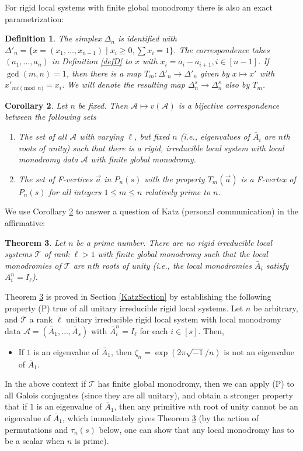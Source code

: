\documentclass[11pt]{amsart}
\newcommand\op{\operatorname}
\newcommand\mt{\mathcal{T}}
\newcommand\ma{\mathcal{A}}
\newtheorem{theorem}{Theorem}[section]
\newtheorem{corollary}[theorem]{Corollary}
\newtheorem{defi}[theorem]{Definition}
\numberwithin{theorem}{subsection}
\begin{document}

For rigid local systems with finite global monodromy there is also an exact parametrization:
\begin{defi}\label{aliA}
The simplex  $\Delta_n$ is identified with $\Delta'_n= \{{x}=(x_1,\dots, x_{n-1})\mid x_i\geq 0, \sum x_i=1\}$. The correspondence takes $(a_1,\dots, a_n)$ in Definition \ref{defD} to ${x}$ with $x_i=a_i-a_{i+1}, i\in[n-1]$.  If $\op{gcd}(m,n)=1$, then there is a map $T_m:\Delta'_n \to\Delta'_n$ given by ${x}\mapsto {x}'$ with $x'_{mi \pmod{n}}=x_i$.   We will denote the resulting map $\Delta^s_n\to \Delta^s_n$ also by $T_m$.
\end{defi}
\begin{corollary}\label{egregiumprime}
Let $n$ be fixed. Then  $\mathcal{A}\mapsto v(\mathcal{A})$  is a bijective correspondence between the following sets
\begin{enumerate}
\item The set of all $\mathcal{A}$ with varying $\ell$, but fixed $n$ (i.e., eigenvalues of $\bar{A}_i$ are $n$th roots of unity) such that there is a rigid, irreducible  local system with local monodromy data $\mathcal{A}$ with finite global monodromy.
\item The set  of F-vertices $\vec{a}$ in $P_n(s)$ with the property $T_m(\vec{a})$ is a F-vertex of $P_n(s)$ for all integers $1\leq m\leq n$ relatively prime to $n$.
\end{enumerate}
\end{corollary}
We use Corollary \ref{egregiumprime} to answer a question of Katz (personal communication) in the affirmative:
\begin{theorem}\label{KatzQ}
Let $n$ be a prime number. There are no rigid irreducible  local systems $\mt$ of rank $\ell>1$ with finite global monodromy such that the local monodromies of $\mt$ are $n$th roots of unity (i.e., the local monodromies $\bar{A}_i$ satisfy $A_i^n=I_{\ell}$).
\end{theorem}
Theorem \ref{KatzQ} is proved  in Section \ref{KatzSection} by establishing the following property (P) true of all unitary irreducible rigid local systems. Let $n$ be arbitrary, and $\mt$ a rank $\ell$ unitary irreducible rigid local system with
local monodromy data $\ma=(\bar{A}_1,\dots,\bar{A}_s)$ with $\bar{A}_i^n=I_{\ell}$ for each $i\in[s]$.
Then,
\begin{itemize}
\item[(P)] If $1$ is an eigenvalue of $\bar{A}_1$, then $\zeta_n=\exp(2\pi\sqrt{-1}/n)$ is not an eigenvalue of $\bar{A}_1$.
\end{itemize}
In the above context if $\mt$ has finite global monodromy, then we can apply  (P) to all Galois conjugates (since they are all unitary), and obtain a stronger property that if  $1$ is an eigenvalue of $\bar{A}_1$, then any primitive $n$th root of unity cannot  be an eigenvalue of $\bar{A}_1$, which immediately gives
Theorem \ref{KatzQ} (by the action of permutations and $\tau_n(s)$  below, one can show that any local monodromy has to be a scalar when $n$ is prime).
\end{document}
